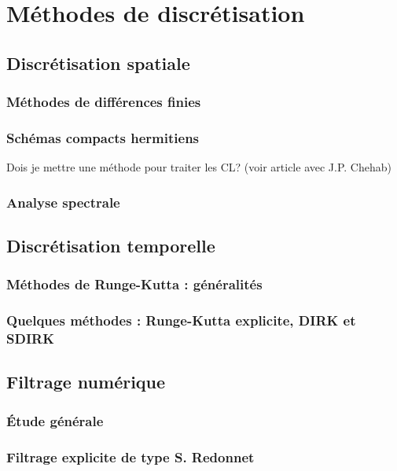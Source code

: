 
\chapter{Méthodes de discrétisation}

\section{Discrétisation spatiale}

\subsection{Méthodes de différences finies}

\subsection{Schémas compacts hermitiens}

Dois je mettre une méthode pour traiter les CL? (voir article avec J.P. Chehab)

\subsection{Analyse spectrale}


\section{Discrétisation temporelle}

\subsection{Méthodes de Runge-Kutta : généralités}

\subsection{Quelques méthodes : Runge-Kutta explicite, DIRK et SDIRK}


\section{Filtrage numérique}

\subsection{\'Etude générale}

\subsection{Filtrage explicite de type S. Redonnet}

